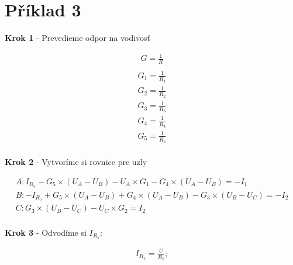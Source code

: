 \section{Příklad 3}

\begin{center}
    \textbf{Krok 1} - Prevedieme odpor na vodivosť
\end{center}
\begin{gather*}
    G = \frac{1}{R}\\
\end{gather*}
\bigbreak
\begin{gather*}
    G_1 = \frac{1}{R_1}\\
    G_2 = \frac{1}{R_2}\\
    G_3 = \frac{1}{R_3}\\
    G_4 = \frac{1}{R_4}\\
    G_5 = \frac{1}{R_5}\\
\end{gather*}

\begin{center}
    \textbf{Krok 2} - Vytvoríme si rovnice pre uzly
\end{center}
\begin{gather*}
    A: I_{R_{5}} - G_{5} \times (U_{A} - U_{B}) - U_{A} \times G_{1} - G_{4} \times (U_{A} - U_{B}) = -I_{1}\\
    B: -I_{R_{5}} + G_{5} \times (U_{A} - U_{B}) + G_{4} \times (U_{A} - U_{B}) - G_{3} \times (U_{B} - U_{C}) = -I_{2}\\
    C: G_{3} \times (U_{B} - U_{C}) - U_{C} \times G_{2} = I_{2}\\
\end{gather*}

\newpage

\begin{center}
    \textbf{Krok 3} - Odvodíme si $I_{R_{5}}$:
\end{center}
\begin{gather*}
I_{R_{5}} = \frac{U}{R_5};
\end{gather*}

